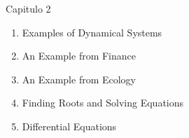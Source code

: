 \begin{frame}{Capitulo 2}

\begin{enumerate}

\item Examples of Dynamical Systems
\item An Example from Finance
\item An Example from Ecology
\item Finding Roots and Solving Equations
\item Differential Equations

\end{enumerate}

\end{frame}
